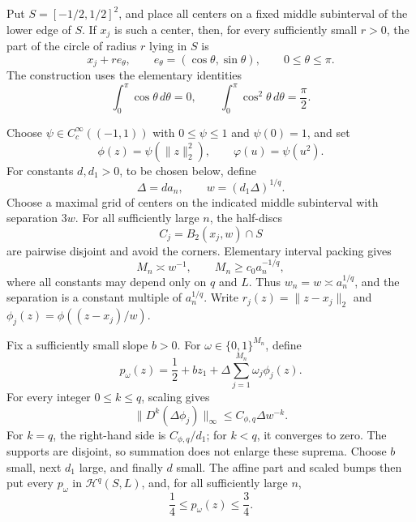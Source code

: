 Put \(S=[-1/2,1/2]^2\), and place all centers on a fixed middle subinterval of the lower edge of \(S\).  If \(x_j\) is such a center, then, for every sufficiently small \(r>0\), the part of the circle of radius \(r\) lying in \(S\) is
\[
 x_j+r e_\theta,
 \qquad e_\theta=(\cos\theta,\sin\theta),
 \qquad 0\leq\theta\leq\pi.
\]
The construction uses the elementary identities
\[
 \int_0^\pi\cos\theta\,d\theta=0,
 \qquad
 \int_0^\pi\cos^2\theta\,d\theta=\frac\pi2.
\]

Choose \(\psi\in C_c^\infty((-1,1))\) with \(0\leq\psi\leq1\) and \(\psi(0)=1\), and set
\[
 \phi(z)=\psi(\lVert z\rVert_2^2),
 \qquad
 \varphi(u)=\psi(u^2).
\]
For constants \(d,d_1>0\), to be chosen below, define
\[
 \Delta=d a_n,
 \qquad
 w=(d_1\Delta)^{1/q}.
\]
Choose a maximal grid of centers on the indicated middle subinterval with separation \(3w\).  For all sufficiently large \(n\), the half-discs
\[
 C_j=B_2(x_j,w)\cap S
\]
are pairwise disjoint and avoid the corners.  Elementary interval packing gives
\[
 M_n\asymp w^{-1},
 \qquad
 M_n\geq c_0a_n^{-1/q},
\]
where all constants may depend only on \(q\) and \(L\).  Thus \(w_n=w\asymp a_n^{1/q}\), and the separation is a constant multiple of \(a_n^{1/q}\).  Write \(r_j(z)=\lVert z-x_j\rVert_2\) and \(\phi_j(z)=\phi((z-x_j)/w)\).

Fix a sufficiently small slope \(b>0\).  For \(\omega\in\{0,1\}^{M_n}\), define
\[
 p_\omega(z)=\frac12+bz_1+\Delta\sum_{j=1}^{M_n}\omega_j\phi_j(z).
\]
For every integer \(0\leq k\leq q\), scaling gives
\[
 \lVert D^k(\Delta\phi_j)\rVert_\infty
 \leq C_{\phi,q}\Delta w^{-k}.
\]
For \(k=q\), the right-hand side is \(C_{\phi,q}/d_1\); for \(k<q\), it converges to zero.  The supports are disjoint, so summation does not enlarge these suprema.  Choose \(b\) small, next \(d_1\) large, and finally \(d\) small.  The affine part and scaled bumps then put every \(p_\omega\) in \(\mathcal H^q(S,L)\), and, for all sufficiently large \(n\),
\[
 \frac14\leq p_\omega(z)\leq\frac34.
\]

